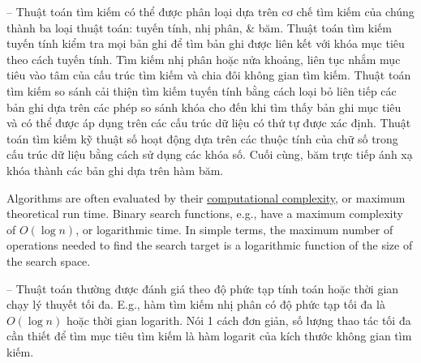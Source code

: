 \documentclass{article}
\begin{document}
-- Thuật toán tìm kiếm có thể được phân loại dựa trên cơ chế tìm kiếm của chúng thành ba loại thuật toán: tuyến tính, nhị phân, \& băm. Thuật toán tìm kiếm tuyến tính kiểm tra mọi bản ghi để tìm bản ghi được liên kết với khóa mục tiêu theo cách tuyến tính. Tìm kiếm nhị phân hoặc nửa khoảng, liên tục nhắm mục tiêu vào tâm của cấu trúc tìm kiếm và chia đôi không gian tìm kiếm. Thuật toán tìm kiếm so sánh cải thiện tìm kiếm tuyến tính bằng cách loại bỏ liên tiếp các bản ghi dựa trên các phép so sánh khóa cho đến khi tìm thấy bản ghi mục tiêu và có thể được áp dụng trên các cấu trúc dữ liệu có thứ tự được xác định. Thuật toán tìm kiếm kỹ thuật số hoạt động dựa trên các thuộc tính của chữ số trong cấu trúc dữ liệu bằng cách sử dụng các khóa số. Cuối cùng, băm trực tiếp ánh xạ khóa thành các bản ghi dựa trên hàm băm.

Algorithms are often evaluated by their \href{https://en.wikipedia.org/wiki/Computational_complexity}{computational complexity}, or maximum theoretical run time. Binary search functions, e.g., have a maximum complexity of $O(\log n)$, or logarithmic time. In simple terms, the maximum number of operations needed to find the search target is a logarithmic function of the size of the search space.

-- Thuật toán thường được đánh giá theo độ phức tạp tính toán hoặc thời gian chạy lý thuyết tối đa. E.g., hàm tìm kiếm nhị phân có độ phức tạp tối đa là $O(\log n)$ hoặc thời gian logarith. Nói 1 cách đơn giản, số lượng thao tác tối đa cần thiết để tìm mục tiêu tìm kiếm là hàm logarit của kích thước không gian tìm kiếm.

\end{document}
